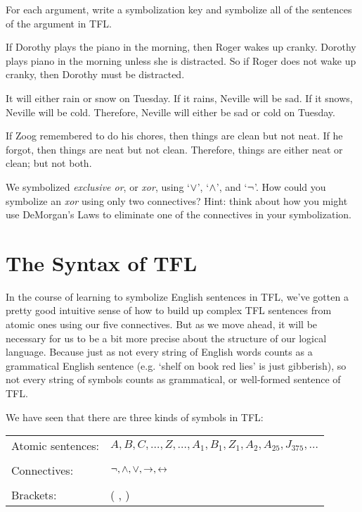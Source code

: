 \problempart
For each argument, write a symbolization key and symbolize all of the sentences of the argument in TFL.
\begin{earg}
\item If Dorothy plays the piano in the morning, then Roger wakes up cranky. Dorothy plays piano in the morning unless she is distracted. So if Roger does not wake up cranky, then Dorothy must be distracted.
\item It will either rain or snow on Tuesday. If it rains, Neville will be sad. If it snows, Neville will be cold. Therefore, Neville will either be sad or cold on Tuesday.
\item If Zoog remembered to do his chores, then things are clean but not neat. If he forgot, then things are neat but not clean. Therefore, things are either neat or clean; but not both.
\end{earg}

\problempart
We symbolized \emph{exclusive or}, or \emph{xor}, using `$\vee$', `$\wedge$', and `$\neg$'. How could you symbolize an \emph{xor} using only two connectives? Hint: think about how you might use DeMorgan's Laws to eliminate one of the connectives in your symbolization.



\section{The Syntax of TFL}\label{s:TFLSyntax}

In the course of learning to symbolize English sentences in TFL, we've gotten a pretty good intuitive sense of how to build up complex TFL sentences from atomic ones using our five connectives.  But as we move ahead, it will be necessary for us to be a bit more precise about the structure of our logical language.  Because just as not every string of English words counts as a grammatical English sentence (e.g. `shelf on book red lies' is just gibberish), so not every string of symbols counts as grammatical, or well-formed sentence of TFL. 

We have seen that there are three kinds of symbols in TFL:
\begin{center}
\begin{tabular}{l l}
Atomic sentences: & $A,B,C,\ldots,Z, \ldots, A_1, B_1,Z_1,A_2,A_{25},J_{375},\ldots$\\
\\
Connectives: & $\neg,\wedge,\vee,\rightarrow,\leftrightarrow$\\
\\
Brackets: &( , )\\
\end{tabular}
\end{center}

